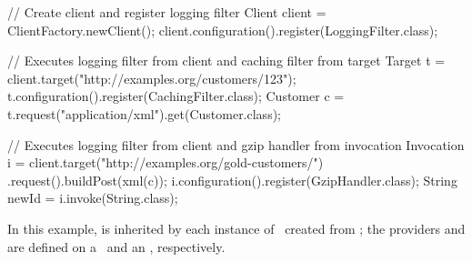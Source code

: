 \begin{listing}{1}
// Create client and register logging filter
Client client = ClientFactory.newClient();
client.configuration().register(LoggingFilter.class);

// Executes logging filter from client and caching filter from target
Target t = client.target("http://examples.org/customers/123");
t.configuration().register(CachingFilter.class);
Customer c = t.request("application/xml").get(Customer.class);

// Executes logging filter from client and gzip handler from invocation
Invocation i = client.target("http://examples.org/gold-customers/")
    .request().buildPost(xml(c));
i.configuration().register(GzipHandler.class);
String newId = i.invoke(String.class);
\end{listing}

In this example,  is inherited by each instance of \Target\ created from ; the providers  and  are defined on a \Target\ and an \Invocation, respectively.








